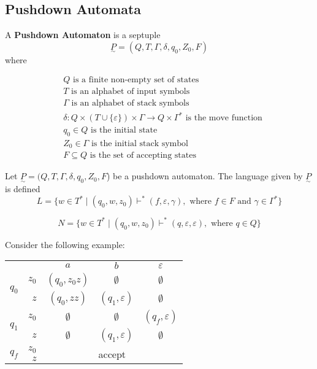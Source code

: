\subsection{Pushdown Automata}\label{subsec:pushdown-automata}
\begin{definition}
    A \textbf{Pushdown Automaton} is a septuple \[\underset{\sim}{P}=\left(Q, T, \Gamma, \delta, q_0, Z_0, F\right)\] where

    \begin{align*}
        &Q \text{ is a finite non-empty set of states}\\
        &T \text{ is an alphabet of input symbols}\\
        &\Gamma \text{ is an alphabet of stack symbols}\\
        &\delta: Q\times (T\cup \{\varepsilon \})\times\Gamma\to Q\times \Gamma^* \text{ is the move function}\\
        &q_0\in Q \text{ is the initial state}\\
        &Z_0\in\Gamma \text{ is the initial stack symbol}\\
        &F\subseteq Q\text{ is the set of accepting states}
    \end{align*}
\end{definition}

\begin{definition}
    Let \(\underset{\sim}{P}=(Q, T, \Gamma, \delta, q_0, Z_0, F\)) be a pushdown automaton. The language given by \(\underset{\sim}{P}\) is defined \[L=\{w\in T^*\mid (q_0, w, z_0) \vdash^* (f, \varepsilon, \gamma), \text{ where } f\in F \text{ and } \gamma\in\Gamma^*\} \]

    \[N=\{w\in T^*\mid (q_0, w, z_0) \vdash^* (q, \varepsilon, \varepsilon), \text{ where } q\in Q\} \]
\end{definition}

Consider the following example:

\begin{center}\begin{tabular}{l r c c c}
    & & \(a\) & \(b\) & \(\varepsilon \) \\\cmidrule{3-5}
    \multirow{2}{*}{\(q_0\)} & \(z_0\) & \((q_0, z_0z)\) & \(\emptyset \) & \(\emptyset \) \\
    & \(z\) & \((q_0, zz)\)  & \((q_1, \varepsilon) \) & \(\emptyset \) \\\midrule
    \multirow{2}{*}{\(q_1\)} & \(z_0\) & \(\emptyset \) & \(\emptyset \) & \((q_f, \varepsilon)\) \\
    & \(z\) & \(\emptyset \) & \((q_1, \varepsilon)\) & \(\emptyset \) \\\midrule
    \multirow{2}{*}{\(q_f\)} & \(z_0\) & \multicolumn{3}{c}{\multirow{2}{*}{accept}}\\
    & \(z\) & & &\\
\end{tabular}\end{center}



